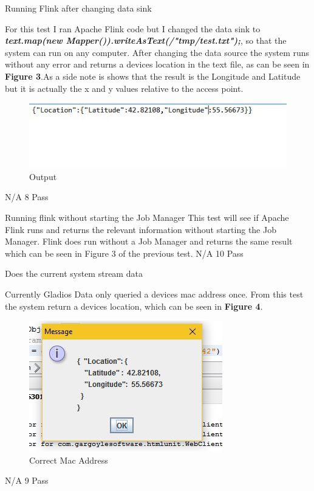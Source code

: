 {Running Flink after changing data sink}
{For this test I ran Apache Flink code but I changed the data sink to \textbf{\textit{  text.map(new Mapper()).writeAsText(/"tmp/test.txt");}}, so that the system can run on any computer. After changing the data source the system runs without any error and returns a devices location in the text file, as can be seen in \textbf{Figure 3}.As a side note is shows that the result is the Longitude and Latitude but it is actually the x and y values relative to the access point.
		\begin{figure}[h]
			\centering
			\includegraphics{query_location_results.jpg}
			\caption{Output}
			\label{fig:Output}
		\end{figure} 
}
		
{N/A}
{8}
{Pass}
		
{Running flink without starting the Job Manager}
{This test will see if Apache Flink runs and returns the relevant information without starting the Job Manager. Flink does run without a Job Manager and returns the same result which can be seen in Figure 3 of the previous test.}
{N/A}
{10}
{Pass}

{Does the current system stream data}
{Currently Gladios Data only queried a devices mac address once. From this test the system return a devices location, which can be seen in \textbf{Figure 4}.
		\begin{figure}[h]
			\centering
			\includegraphics{right_mac.jpg}
			\caption{Correct Mac Address}
			\label{fig:right_mac}
		\end{figure} 
}
{N/A}
{9}	
{Pass}	
	

